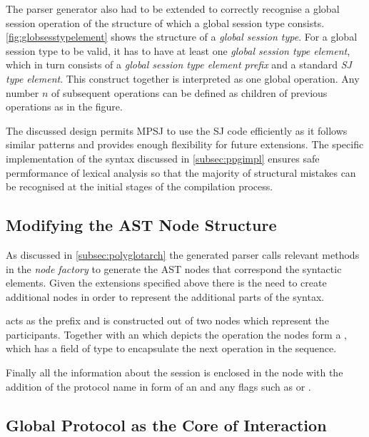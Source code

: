 The parser generator also had to be extended to correctly recognise a global session operation of the structure  of which a global session type consists. \autoref{fig:globsesstypelement} shows the structure of a \textit{global session type}. For a global session type to be valid, it has to have at least one \textit{global session type element}, which in turn consists of a \textit{global session type element prefix} and a standard \textit{SJ type element}. This construct together is interpreted as one global operation. Any number $n$ of subsequent operations can be defined as children of previous operations as in the figure. 

The discussed design permits MPSJ to use the SJ code efficiently as it follows similar patterns and provides enough flexibility for future extensions. The specific implementation of the syntax discussed in \autoref{subsec:ppgimpl} ensures safe permformance of lexical analysis so that the majority of structural mistakes can be recognised at the initial stages of the compilation process.


\subsection{Modifying the AST Node Structure}

As discussed in \autoref{subsec:polyglotarch} the generated parser calls relevant methods in the \textit{node factory} to generate the AST nodes that correspond the syntactic elements. Given the extensions specified above there is the need to create additional nodes in order to represent the additional parts of the syntax.

 acts as the prefix and is constructed out of two  nodes which represent the participants. Together with an  which depicts the operation the nodes form a , which has a field  of type  to encapsulate the next operation in the sequence.

Finally all the information about the session is enclosed in the  node with the addition of the protocol name in form of an  and any flags such as  or . 

\subsection{Global Protocol as the Core of Interaction}
\label{subsec:globprotocolcore}

